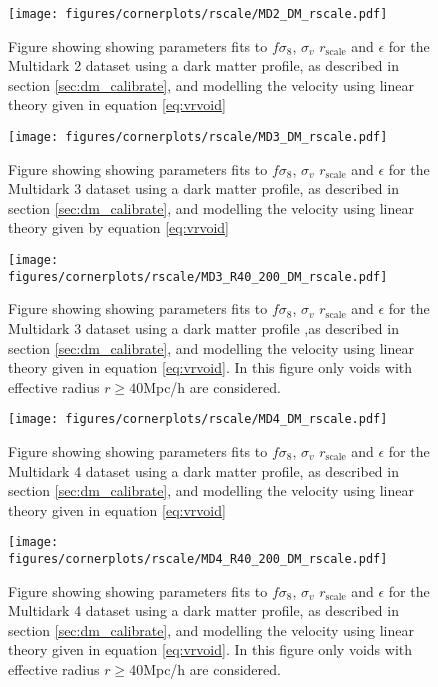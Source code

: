 \begin{figure}[H]
    \texttt{[image: figures/cornerplots/rscale/MD2\_DM\_rscale.pdf]}
    \caption{Figure showing showing parameters fits to $f\sigma_8$, $\sigma_v$ $r_{\mathrm{scale}}$ and $\epsilon$ for the Multidark 2 dataset using a dark matter profile, as described in section \ref{sec:dm_calibrate}, and modelling the velocity using linear theory given in equation \ref{eq:vrvoid}}
    \label{fig:MD2DM}
\end{figure}

\begin{figure}[H]
    \texttt{[image: figures/cornerplots/rscale/MD3\_DM\_rscale.pdf]}
    \caption{Figure showing showing parameters fits to $f\sigma_8$, $\sigma_v$ $r_{\mathrm{scale}}$ and $\epsilon$ for the Multidark 3 dataset using a dark matter profile, as described in section \ref{sec:dm_calibrate}, and modelling the velocity using linear theory given by equation \ref{eq:vrvoid}}
    \label{fig:MD3DM}
\end{figure}

\begin{figure}[H]
    \texttt{[image: figures/cornerplots/rscale/MD3\_R40\_200\_DM\_rscale.pdf]}
    \caption{Figure showing showing parameters fits to $f\sigma_8$, $\sigma_v$ $r_{\mathrm{scale}}$ and $\epsilon$ for the Multidark 3 dataset using a dark matter profile ,as described in section \ref{sec:dm_calibrate}, and modelling the velocity using linear theory given in equation \ref{eq:vrvoid}. In this figure only voids with effective radius $r \geq 40$Mpc/h are considered.}
    \label{fig:MD3DMR40}
\end{figure}

\begin{figure}[H]
    \texttt{[image: figures/cornerplots/rscale/MD4\_DM\_rscale.pdf]}
    \caption{Figure showing showing parameters fits to $f\sigma_8$, $\sigma_v$ $r_{\mathrm{scale}}$ and $\epsilon$ for the Multidark 4 dataset using a dark matter profile, as described in section \ref{sec:dm_calibrate}, and modelling the velocity using linear theory given in equation \ref{eq:vrvoid}}
    \label{fig:MD4DM}
\end{figure}

\begin{figure}[H]
    \texttt{[image: figures/cornerplots/rscale/MD4\_R40\_200\_DM\_rscale.pdf]}
    \caption{Figure showing showing parameters fits to $f\sigma_8$, $\sigma_v$ $r_{\mathrm{scale}}$ and $\epsilon$ for the Multidark 4 dataset using a dark matter profile, as described in section \ref{sec:dm_calibrate}, and modelling the velocity using linear theory given in equation \ref{eq:vrvoid}. In this figure only voids with effective radius $r \geq 40$Mpc/h are considered.}
    \label{fig:MD4DMR40}
\end{figure}

